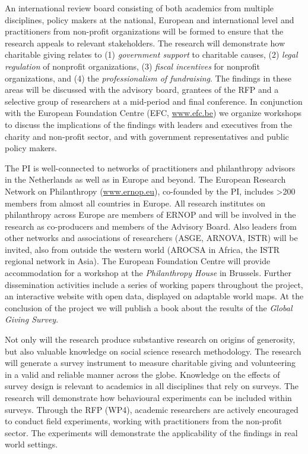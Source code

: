 \documentclass[twocolumn, serif, rga, numeric]{jote-article}
\begin{document}
An international review board consisting of both academics from multiple disciplines, policy makers at the national, European and international level and practitioners from non-profit organizations will be formed to ensure that the research appeals to relevant stakeholders. The research will demonstrate how charitable giving relates to (1) \emph{government support} to charitable causes, (2) \emph{legal regulation} of nonprofit organizations, (3) \emph{fiscal incentives} for nonprofit organizations, and (4) the \emph{professionalism of fundraising}. The findings in these areas will be discussed with the advisory board, grantees of the RFP and a selective group of researchers at a mid-period and final conference.
In conjunction with the European Foundation Centre (EFC, \href{http://www.efc.be}{www.efc.be}) we organize workshops to discuss the implications of the findings with leaders and executives from the charity and non-profit sector, and with government representatives and public policy makers.

The PI is well-connected to networks of practitioners and philanthropy advisors in the Netherlands as well as in Europe and beyond. The European Research Network on Philanthropy (\href{http://www.ernop.eu}{www.ernop.eu}), co-founded by the PI, includes \textgreater200 members from almost all countries in Europe.
All research institutes on philanthropy across Europe are members of ERNOP and will be involved in the research as co-producers and members of the Advisory Board. Also leaders from other networks and associations of researchers (ASGE, ARNOVA, ISTR) will be invited, also from outside the western world (AROCSA in Africa, the ISTR regional network in Asia).
The European Foundation Centre will provide accommodation for a workshop at the \emph{Philanthropy House} in Brussels. Further dissemination activities include a series of working papers throughout the project, an interactive website with open data, displayed on adaptable world maps.
At the conclusion of the project we will publish a book about the results of the \emph{Global Giving Survey}.

Not only will the research produce substantive research on origins of generosity, but also valuable knowledge on social science research methodology. The research will generate a survey instrument to measure charitable giving and volunteering in a valid and reliable manner across the globe. Knowledge on the effects of survey design is relevant to academics in all disciplines that rely on surveys. The research will demonstrate how behavioural experiments can be included within surveys.
Through the RFP (WP4), academic researchers are actively encouraged to conduct field experiments, working with practitioners from the non-profit sector. The experiments will demonstrate the applicability of the findings in real world settings.
\end{document}
